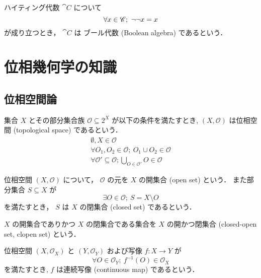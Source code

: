 \documentclass[titlepage]{ltjsreport}
\newtheorem[S]{theorem}{定理}[chapter]
\newtheorem[S]{definition}[theorem]{定義}
\newtheorem[S]{example}[theorem]{例}
\begin{document}
\begin{definition}[ブール代数]\label{def:boolean-algebra}
  ハイティング代数 $\cat{C}$ について
  \begin{equation}
    \forall x\in\objs{\cat{C}};\ \neg\neg x=x
  \end{equation}
  が成り立つとき，
  $\cat{C}$ は ブール代数 (Boolean algebra) であるという．
\end{definition}

\chapter{位相幾何学の知識}

\section{位相空間論}

\begin{definition}[位相空間]\label{def:topological-space}
  集合 $X$ とその部分集合族 $\mathcal{O}\subseteq2^X$ が以下の条件を満たすとき,
  $(X,\mathcal{O})$ は位相空間 (topological space) であるという．
  \begin{align}
    \emptyset,X\in\mathcal{O}                                 \\
    \forall O_1,O_2\in\mathcal{O};\ O_1\cup O_2\in\mathcal{O} \\
    \forall \mathcal{O}'\subseteq\mathcal{O};
    \bigcup_{O\in\mathcal{O}'}O\in\mathcal{O}
  \end{align}
\end{definition}

\begin{definition}
  位相空間 $(X,\mathcal{O})$ について，
  $\mathcal{O}$ の元を $X$ の開集合 (open set) という．
  また部分集合 $S\subseteq X$ が
  \begin{equation}
    \exists O\in\mathcal{O};\ S=X\setminus O
  \end{equation}
  を満たすとき，
  $S$ は $X$ の閉集合 (closed set) であるという．

  $X$ の開集合でありかつ $X$ の閉集合である集合を
  $X$ の開かつ閉集合 (closed-open set, clopen set) という．
\end{definition}

\begin{definition}[連続写像]\label{def:continuous-map}
  位相空間 $(X,\mathcal{O}_X)$ と $(Y,\mathcal{O}_Y)$ および写像 $f:X\to Y$ が
  \begin{equation}
    \forall O\in\mathcal{O}_Y;\ f^{-1}(O)\in\mathcal{O}_X
  \end{equation}
  を満たすとき,
  $f$ は連続写像 (continuous map) であるという．
\end{definition}
\end{document}
